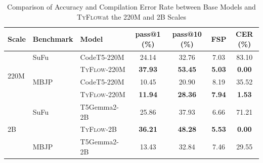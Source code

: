 \documentclass[manuscript,screen]{acmart}
\newcommand{\updir}{\textcolor{black}{↑}}  %
\newcommand{\downdir}{\textcolor{black}{↓}}
\newcommand{\toolname}[1]{\textsc{#1}}
\newcommand{\mainname}{\toolname{TyFlow}\xspace}
\begin{document}
\begin{table}[ht]
\centering
\begin{threeparttable}
\caption{Comparison of Accuracy and Compilation Error Rate between    {\color{revblue}Base Models } and \mainname    {\color{revblue}at the 220M } and    {\color{revblue}2B Scales} }
\label{tab:model-results}
  \begin{tabular}{
    l 
    l
    l
    c 
    c 
    c 
    c
}
 \toprule
   {\color{revblue}Scale } &  {\color{revblue}Benchmark }&  Model & {pass@1 (\%)\tnote{\updir}} & {pass@10 (\%)\tnote{\updir}} & {FSP\tnote{\downdir}} & {CER (\%)\tnote{\downdir}} \\
\midrule
  \multirow{4}{*}{220M}
         &  {\color{revblue}SuFu }&  CodeT5-220M         & 24.14 & 32.76 & 7.03 & 83.10 \\
        &        &    \mainname{\color{revblue}-220M      } &    \textbf{\color{revblue}37.93}  &    \textbf{\color{revblue}53.45}  &    \textbf{\color{revblue}5.03} & \textbf{\color{revblue}0.00}  \\
  \cmidrule(lr){2-7}
         &  {\color{revblue}MBJP }& {\color{revblue}CodeT5-220M         }& {\color{revblue}10.45 }& {\color{revblue}20.90 }& {\color{revblue}8.19 }& {\color{revblue}35.52 }\\
        &      &  \mainname-220M      &    \textbf{\color{revblue}11.94}  &    \textbf{\color{revblue}28.36}  &    \textbf{\color{revblue}7.94}  &    \textbf{\color{revblue}1.53}  \\
 \midrule
\multirow{8}{*}{2B}
         &  {\color{revblue}SuFu }& {\color{revblue}T5Gemma2-2B         }& {\color{revblue}25.86 }& {\color{revblue}37.93 }& {\color{revblue}6.66 }& {\color{revblue}71.21 }\\
        &      &  \mainname-2B        & \textbf{\color{revblue}36.21} & \textbf{\color{revblue}48.28} & \textbf{\color{revblue}5.53} & \textbf{0.00} \\
  \cmidrule(lr){2-7}
         &    {\color{revblue}MBJP } &    {\color{revblue}T5Gemma2-2B         } &    {\color{revblue}13.43 } &    {\color{revblue}32.84 } &    {\color{revblue}7.46 }& {\color{revblue}29.55 } \\

\end{tabular}
\end{threeparttable}
\end{table}
\end{document}
